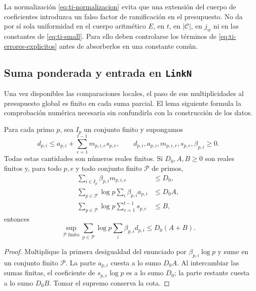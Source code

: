 La normalización \eqref{eq:ti-normalizacion} evita que una
extensión del cuerpo de coeficientes introduzca un falso factor
de ramificación en el presupuesto. No da por sí sola uniformidad
en el cuerpo aritmético $E$, en $t$, en $|\mathcal C|$, en
$j_w$ ni en las constantes de \eqref{eq:ti-small}.
Para ello deben controlarse los términos de
\eqref{eq:ti-errores-explicitos} antes de absorberlos en una
constante común.

\subsection{Suma ponderada y entrada en \texttt{LinkN}}

Una vez disponibles las comparaciones locales, el paso de sus
multiplicidades al presupuesto global es finito en cada suma
parcial. El lema siguiente formula la comprobación numérica
necesaria sin confundirla con la construcción de los datos.

\begin{lema}
\label{lem:ti-presupuesto}
Para cada primo $p$, sea $I_p$ un conjunto finito y supongamos
\[
 d_{p,i}\le a_{p,i}+\sum_{e=1}^{t-1}m_{p,i,e}s_{p,e},
 \qquad d_{p,i},a_{p,i},m_{p,i,e},s_{p,e},\beta_{p,i}\ge0.
\]
Todas estas cantidades son números reales finitos.
Si $D_0,A,B\ge0$ son reales finitos y, para todo $p,e$ y todo conjunto finito
$\mathcal P$ de primos,
\begin{equation}
\begin{aligned}
 \sum_{i\in I_p}\beta_{p,i}m_{p,i,e}&\le D_0,\\
 \sum_{p\in\mathcal P}\log p\sum_i\beta_{p,i}a_{p,i}&\le D_0A,\\
 \sum_{p\in\mathcal P}\log p\sum_{e=1}^{t-1}s_{p,e}&\le B,
\end{aligned}
\label{eq:ti-hip-presupuesto}
\end{equation}
entonces
\begin{equation}
 \sup_{\mathcal P\text{ finito}}
 \sum_{p\in\mathcal P}\log p\sum_i\beta_{p,i}d_{p,i}
 \le D_0(A+B).
 \label{eq:ti-presupuesto}
\end{equation}
\end{lema}
\begin{proof}
Multiplique la primera desigualdad del enunciado por
$\beta_{p,i}\log p$ y sume en un conjunto finito $\mathcal P$.
La parte $a_{p,i}$ cuesta a lo sumo $D_0A$.
Al intercambiar las sumas finitas, el coeficiente de
$s_{p,e}\log p$ es a lo sumo $D_0$; la parte restante cuesta
a lo sumo $D_0B$. Tomar el supremo conserva la cota.
\end{proof}

